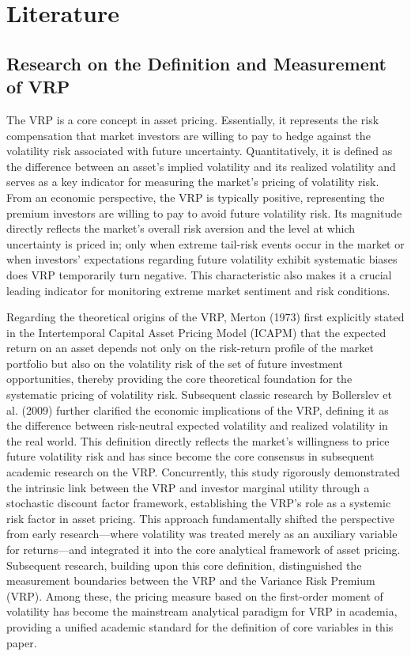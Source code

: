 \documentclass[a4paper, 12pt]{article}    %
\begin{document}
\section{Literature}

\subsection{Research on the Definition and Measurement of VRP}

The VRP is a core concept in asset pricing. Essentially, it represents the risk compensation that market investors are willing to pay to hedge against the volatility risk associated with future uncertainty. Quantitatively, it is defined as the difference between an asset’s implied volatility and its realized volatility and serves as a key indicator for measuring the market’s pricing of volatility risk. From an economic perspective, the VRP is typically positive, representing the premium investors are willing to pay to avoid future volatility risk. Its magnitude directly reflects the market’s overall risk aversion and the level at which uncertainty is priced in; only when extreme tail-risk events occur in the market or when investors’ expectations regarding future volatility exhibit systematic biases does VRP temporarily turn negative. This characteristic also makes it a crucial leading indicator for monitoring extreme market sentiment and risk conditions.

Regarding the theoretical origins of the VRP, Merton (1973) first explicitly stated in the Intertemporal Capital Asset Pricing Model (ICAPM) that the expected return on an asset depends not only on the risk-return profile of the market portfolio but also on the volatility risk of the set of future investment opportunities, thereby providing the core theoretical foundation for the systematic pricing of volatility risk. Subsequent classic research by Bollerslev et al. (2009) further clarified the economic implications of the VRP, defining it as the difference between risk-neutral expected volatility and realized volatility in the real world. This definition directly reflects the market’s willingness to price future volatility risk and has since become the core consensus in subsequent academic research on the VRP. Concurrently, this study rigorously demonstrated the intrinsic link between the VRP and investor marginal utility through a stochastic discount factor framework, establishing the VRP’s role as a systemic risk factor in asset pricing. This approach fundamentally shifted the perspective from early research—where volatility was treated merely as an auxiliary variable for returns—and integrated it into the core analytical framework of asset pricing. Subsequent research, building upon this core definition, distinguished the measurement boundaries between the VRP and the Variance Risk Premium (VRP). Among these, the pricing measure based on the first-order moment of volatility has become the mainstream analytical paradigm for VRP in academia, providing a unified academic standard for the definition of core variables in this paper.
\end{document}
